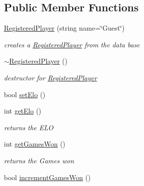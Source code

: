\subsection*{Public Member Functions}
\begin{DoxyCompactItemize}
\item 
\hypertarget{classRegisteredPlayer_a456be7066169306026a0d7d359d74799}{
\hyperlink{classRegisteredPlayer_a456be7066169306026a0d7d359d74799}{RegisteredPlayer} (string name=\char`\"{}Guest\char`\"{})}
\label{classRegisteredPlayer_a456be7066169306026a0d7d359d74799}

\begin{DoxyCompactList}\small\item\em creates a \hyperlink{classRegisteredPlayer}{RegisteredPlayer} from the data base \item\end{DoxyCompactList}\item 
\hypertarget{classRegisteredPlayer_a9cc8da7f1f03440e38e5bfddd90c448c}{
\hyperlink{classRegisteredPlayer_a9cc8da7f1f03440e38e5bfddd90c448c}{$\sim$RegisteredPlayer} ()}
\label{classRegisteredPlayer_a9cc8da7f1f03440e38e5bfddd90c448c}

\begin{DoxyCompactList}\small\item\em destructor for \hyperlink{classRegisteredPlayer}{RegisteredPlayer} \item\end{DoxyCompactList}\item 
bool \hyperlink{classRegisteredPlayer_aae6a64176b51f7e7b3b1ef745c9f1119}{setElo} ()
\item 
\hypertarget{classRegisteredPlayer_ae4c5461f0f7444025402a23a590b491b}{
int \hyperlink{classRegisteredPlayer_ae4c5461f0f7444025402a23a590b491b}{getElo} ()}
\label{classRegisteredPlayer_ae4c5461f0f7444025402a23a590b491b}

\begin{DoxyCompactList}\small\item\em returns the ELO \item\end{DoxyCompactList}\item 
\hypertarget{classRegisteredPlayer_a6f2c3d36cfe1451955a48c10e07f27d6}{
int \hyperlink{classRegisteredPlayer_a6f2c3d36cfe1451955a48c10e07f27d6}{getGamesWon} ()}
\label{classRegisteredPlayer_a6f2c3d36cfe1451955a48c10e07f27d6}

\begin{DoxyCompactList}\small\item\em returns the Games won \item\end{DoxyCompactList}\item 
\hypertarget{classRegisteredPlayer_a7511d11c93e2571b776f332154256e53}{
bool \hyperlink{classRegisteredPlayer_a7511d11c93e2571b776f332154256e53}{incrementGamesWon} ()}
\label{classRegisteredPlayer_a7511d11c93e2571b776f332154256e53}


\end{DoxyCompactItemize}
